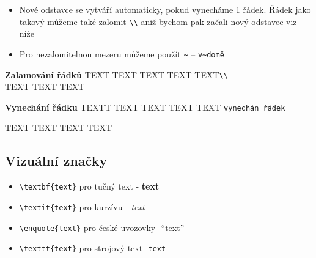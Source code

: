 \begin{itemize}
\begin{multicols}{2}
    \end{multicols}

          
        
        
    \item Nové odstavce se vytváří automaticky, pokud vynecháme 1 řádek. Řádek jako takový můžeme také zalomit \verb|\\| aniž bychom pak začali nový odstavec viz níže
    \item Pro nezalomitelnou mezeru můžeme použít \verb|~| -- \verb|v~domě|
\end{itemize}
 
    \textbf{Zalamování řádků}
    TEXT TEXT TEXT TEXT TEXT\verb|\\|\\ TEXT TEXT TEXT
    
    \textbf{Vynechání řádku}
    TEXTT TEXT TEXT TEXT TEXT \verb|vynechán řádek|
    
    TEXT TEXT TEXT TEXT
\subsection{Vizuální značky}
\begin{itemize}
    \item \verb|\textbf{text}| pro tučný text - \textbf{text}
    \item \verb|\textit{text}| pro kurzívu - \textit{text}
    \item \verb|\enquote{text}| pro české uvozovky -\enquote{text}
    \item \verb|\texttt{text}| pro strojový text -\texttt{text}

\end{itemize}

